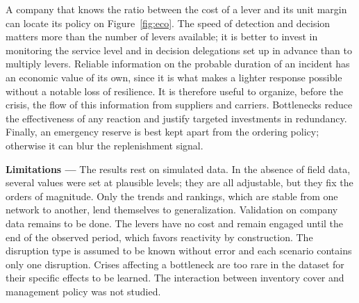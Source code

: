 A company that knows the ratio between the cost of a lever and its unit margin can locate its policy on Figure~\ref{fig:eco}. The speed of detection and decision matters more than the number of levers available; it is better to invest in monitoring the service level and in decision delegations set up in advance than to multiply levers. Reliable information on the probable duration of an incident has an economic value of its own, since it is what makes a lighter response possible without a notable loss of resilience. It is therefore useful to organize, before the crisis, the flow of this information from suppliers and carriers. Bottlenecks reduce the effectiveness of any reaction and justify targeted investments in redundancy. Finally, an emergency reserve is best kept apart from the ordering policy; otherwise it can blur the replenishment signal.

\label{sec:5.3}

\textbf{Limitations — }The results rest on simulated data. In the absence of field data, several values were set at plausible levels; they are all adjustable, but they fix the orders of magnitude. Only the trends and rankings, which are stable from one network to another, lend themselves to generalization. Validation on company data remains to be done. The levers have no cost and remain engaged until the end of the observed period, which favors reactivity by construction. The disruption type is assumed to be known without error and each scenario contains only one disruption. Crises affecting a bottleneck are too rare in the dataset for their specific effects to be learned. The interaction between inventory cover and management policy was not studied.
